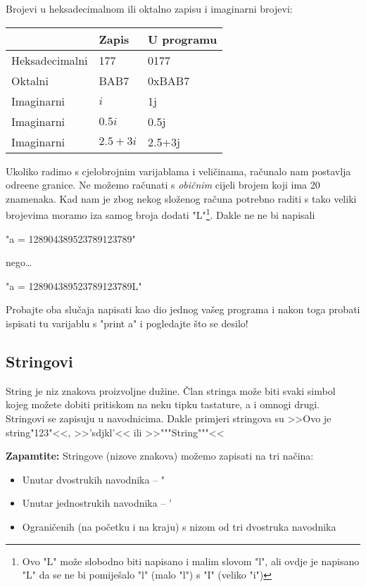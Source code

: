 	Brojevi u heksadecimalnom ili oktalno zapisu i imaginarni brojevi:

	\vspace{3mm}
	\begin{tabular}{l|l|l}
		& Zapis & U programu \\	
		\hline
		Heksadecimalni & 177 & 0177 \\
		\hline
		Oktalni & BAB7& 0xBAB7 \\
		\hline
		Imaginarni & $i$ & 1j \\
		\hline 
		Imaginarni & $0.5i$ & 0.5j \\
		\hline 
		Imaginarni & $2.5+3i$ & 2.5+3j \\
	\end{tabular}
	\vspace{3mm}

	Ukoliko radimo s cjelobrojnim varijablama i veli\v{c}inama, ra\v{c}unalo nam
	postavlja odre\dj{}ene granice. Ne mo\v{z}emo ra\v{c}unati s \emph{obi\v{c}nim}
	cijeli brojem koji ima 20 znamenaka. Kad nam je zbog nekog slo\v{z}enog ra\v{c}una
	potrebno raditi s tako veliki brojevima moramo iza samog broja dodati "L"\footnote{Ovo
	"L" mo\v{z}e slobodno biti napisano i malim slovom "l", ali ovdje je napisano "L"
	da se ne bi pomije\v{s}alo "l" (malo "l") s "I" (veliko "i")}. Dakle ne
	ne bi napisali 
	
	"a = 128904389523789123789"

	nego\dots

	"a = 128904389523789123789L"

	Probajte oba slu\v{c}aja napisati kao dio jednog va\v{s}eg programa i nakon toga
	probati ispisati tu varijablu s "print a" i pogledajte \v{s}to se desilo!

\subsection{Stringovi}

	String je niz znakova proizvoljne du\v zine. \v{C}lan stringa mo\v{z}e biti svaki
	simbol kojeg mo\v{z}ete dobiti pritiskom na neku tipku tastature, a i omnogi drugi.
	Stringovi se zapisuju u navodnicima. Dakle primjeri stringova su 
	>>Ovo je string"123"<<, >>'sdjkl'<< ili >>"""String"""<<

\textbf{Zapamtite:} Stringove (nizove znakova) mo\v{z}emo zapisati
na tri na\v{c}ina: 

	\begin{itemize}
		\item Unutar dvostrukih navodnika -- " 
		\item Unutar jednostrukih navodnika -- '
		\item Ograni\v{c}enih (na po\v{c}etku i na kraju) s nizom od tri dvostruka
			navodnika
	\end{itemize}

